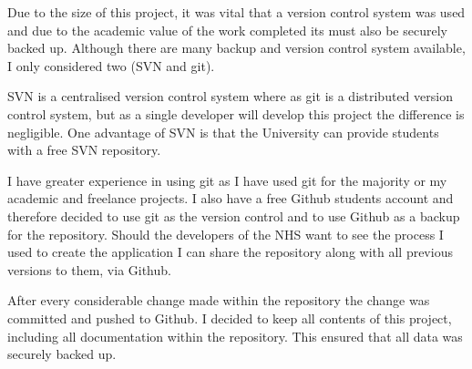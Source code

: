 Due to the size of this project, it was vital that a version control system was used and due to the academic value of the work completed its must also be securely backed up. Although there are many backup and version control system available, I only considered two (SVN and git).

SVN is a centralised version control system where as git \cite{git} is a distributed version control system, but as a single developer will develop this project the difference is negligible. One advantage of SVN is that the University can provide students with a free SVN repository.

I have greater experience in using git as I have used git for the majority or my academic and freelance projects. I also have a free Github students account and therefore decided to use git as the version control and to use Github \cite{github} as a backup for the repository. Should the developers of the NHS want to see the process I used to create the application I can share the repository along with all previous versions to them, via Github.

After every considerable change made within the repository the change was committed and pushed to Github. I decided to keep all contents of this project, including all documentation within the repository. This ensured that all data was securely backed up.

